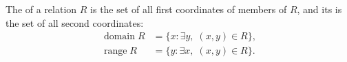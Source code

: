 The  of a relation $R$ is the set of all first coordinates of members of $R$, and its  is the set of all second coordinates:
\begin{align*}
\operatorname{domain} R &= \{x: \exists y,\; (x,y) \in R\}, \\
\operatorname{range} R &= \{y: \exists x,\; (x,y) \in R\}.
\end{align*}
